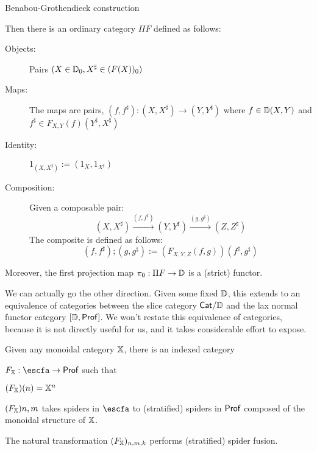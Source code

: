\documentclass[12pt]{ociamthesis}  %
\newcommand{\Cat}{{\sf Cat}}
\begin{document}
\begin{theorem}{Benabou-Grothendieck construction}

Then there is an ordinary category $\Pi F$ defined as follows:


\begin{description}
\item[Objects:] Pairs $(X\in \mathbb{D}_0, X^\sharp \in (F(X))_0)$
\item[Maps:] The maps are pairs, $(f, f^\sharp):(X,X^\sharp )\to (Y,Y^\sharp)$ where $f \in \mathbb{D}(X,Y)$ and $f^\sharp \in F_{X,Y}(f)(Y^\sharp,X^\sharp)$
\item[Identity:] $1_{(X,X^\sharp)} := (1_X, 1_{X^\sharp})$
\item[Composition:] Given a composable pair:
$$(X,X^\sharp)\xrightarrow{(f, f^\sharp)} (Y,Y^\sharp)\xrightarrow{(g, g^\sharp)} (Z,Z^\sharp)$$
The composite is defined as follows:
$$(f, f^\sharp);(g, g^\sharp):= (F_{X,Y,Z}(f,g))(f^\sharp, g^\sharp)$$
\end{description}


Moreover, the first projection map $\pi_0:\Pi F\to \mathbb{D}$  is a (strict) functor.


We can actually go the other direction.  Given some fixed $\mathbb{D}$, this extends to an equivalence of categories between the slice category $\Cat/\D$ and the lax normal functor category $[\mathbb{D},{\sf Prof}]$.  We won't restate this equivalence of categories, because it is not directly useful for us, and it takes considerable effort to expose.
\end{theorem}


\begin{definition}
\newcommand{\esfa}{{\sf ESFA}}
Given any monoidal category $\mathbb{X}$, there is an indexed category

$F_\X:\escfa\to \Prof$ such that  
\begin{description}
\item $(F_{\mathbb{X}})(n) = \mathbb{X}^n$
\item $(F_{\mathbb{X}}){n,m}$ takes spiders in $\escfa$ to (stratified) spiders in ${\sf Prof}$ composed of the monoidal structure of $\mathbb{X}$.
\item The natural transformation $(F_{\mathbb{X}})_{n,m,k}$ performs (stratified) spider fusion.
\end{description}


\end{definition}
\end{document}
